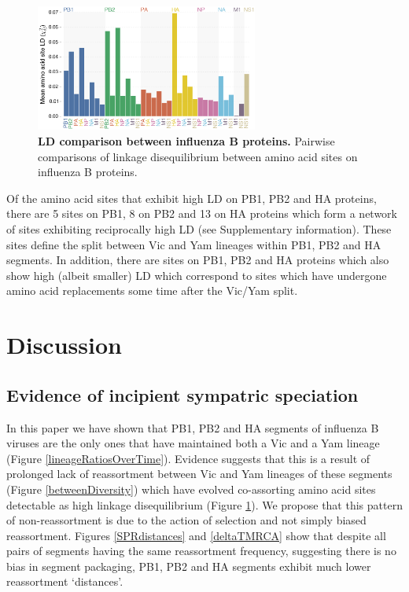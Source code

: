 \documentclass[11pt,oneside,letterpaper]{article}
\begin{document}
\begin{figure}[h]
	\centering	
	\includegraphics[width=0.65\textwidth]	{figures/InfB_aaMeanLD.png}
	\caption{\textbf{LD comparison between influenza B proteins.}
Pairwise comparisons of linkage disequilibrium between amino acid sites on influenza B proteins.}
	\label{segmentLD}
\end{figure}

Of the amino acid sites that exhibit high LD on PB1, PB2 and HA proteins, there are 5 sites on PB1, 8 on PB2 and 13 on HA proteins which form a network of sites exhibiting reciprocally high LD (see Supplementary information).
These sites define the split between Vic and Yam lineages within PB1, PB2 and HA segments.
In addition, there are sites on PB1, PB2 and HA proteins which also show high (albeit smaller) LD which correspond to sites which have undergone amino acid replacements some time after the Vic/Yam split.

\section*{Discussion}

\subsection*{Evidence of incipient sympatric speciation}
In this paper we have shown that PB1, PB2 and HA segments of influenza B viruses are the only ones that have maintained both a Vic and a Yam lineage (Figure \ref{lineageRatiosOverTime}).
Evidence suggests that this is a result of prolonged lack of reassortment between Vic and Yam lineages of these segments (Figure \ref{betweenDiversity}) which have evolved co-assorting amino acid sites detectable as high linkage disequilibrium (Figure \ref{segmentLD}).
We propose that this pattern of non-reassortment is due to the action of selection and not simply biased reassortment.
Figures \ref{SPRdistances} and \ref{deltaTMRCA} show that despite all pairs of segments having the same reassortment frequency, suggesting there is no bias in segment packaging, PB1, PB2 and HA segments exhibit much lower reassortment `distances'.
\end{document}
